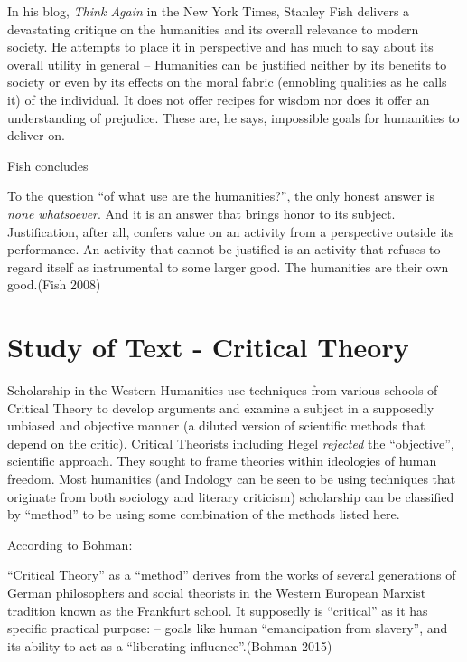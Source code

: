In his blog, {\sl Think Again} in the New York Times, Stanley Fish delivers a devastating critique on the humanities and its overall relevance to modern society. He attempts to place it in perspective and has much to say about its overall utility in general – Humanities can be justified neither by its benefits to society or even by its effects on the moral fabric (ennobling qualities as he calls it) of the individual. It does not offer recipes for  wisdom nor does it offer an understanding of prejudice. These are, he says, impossible goals for humanities to deliver on. 

Fish concludes
\begin{myquote}
To the question ``of what use are the humanities?'', the only honest answer is {\sl none whatsoever}. And it is an answer that brings honor to its subject. Justification, after all, confers value on an activity from a perspective outside its performance. An activity that cannot be justified is an activity that refuses to regard itself as instrumental to some larger good. The humanities are their own good.\hfill (Fish 2008)
\end{myquote}

\section*{Study of Text - Critical Theory}

Scholarship in the Western Humanities use techniques from various schools of Critical Theory to develop arguments and examine a subject in a supposedly unbiased and objective manner (a diluted version of scientific methods that depend on the critic). Critical Theorists including Hegel {\sl rejected} the ``objective'', scientific approach. They sought to frame theories within ideologies of human freedom. Most humanities (and Indology can be seen to be using techniques that originate from both sociology and literary criticism) scholarship can be classified by ``method'' to be using some combination of the methods listed here.

According to Bohman:
\begin{myquote}
``Critical Theory'' as a ``method'' derives from the works of several generations of German philosophers and social theorists in the Western European Marxist tradition known as the Frankfurt school. It supposedly is ``critical'' as it has specific practical purpose: -- goals like human ``emancipation from slavery'', and its ability to act as a ``liberating influence''.\hfill (Bohman 2015)
\end{myquote}

